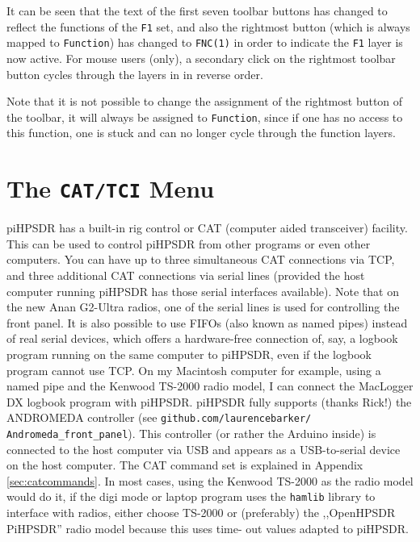 \documentclass[12pt]{book}
\def\bltt#1{\texttt{\color{blue}#1}}
\def\pH{pi\-HPSDR\xspace}
\begin{document}
It can be seen that the text of the first seven toolbar buttons has changed to reflect
the functions of the \texttt{F1} set, and also the rightmost button (which is always mapped
to \bltt{Function}) has changed to \texttt{FNC(1)} in order to indicate the \texttt{F1}
layer is now active. For mouse users (only), a secondary click on the rightmost toolbar
button cycles through the layers in in reverse order.

Note that it is not possible to change the assignment of the  rightmost button of the toolbar,
it will always be assigned to \bltt{Function}, since if one has no access to this
function, one is stuck and can no longer cycle through the function layers.

\section{The \texttt{CAT/TCI} Menu}

\pH has a built-in rig control or CAT (computer aided transceiver) facility. This can be used to control
\pH from other programs or even other computers. You can have up to three simultaneous CAT connections
via TCP, and three additional CAT connections via serial lines (provided the host computer running \pH
has those serial interfaces available). Note that on the new Anan G2-Ultra radios, one of the serial lines
is used for controlling the front panel.
It is also possible to use FIFOs (also known as named pipes) instead of real serial devices, which offers a
hardware-free connection
of, say, a logbook program running on the same computer to \pH, even if the logbook program cannot use
TCP. On my Macintosh computer for example, using a named pipe and the Kenwood TS-2000 radio model,
I can connect the MacLogger DX logbook program with \pH.
\pH fully supports (thanks Rick!) the ANDROMEDA controller (see \texttt{github.com/laurencebarker/
Andromeda\_front\_panel}).
This controller (or rather the Arduino inside) is connected to the host computer via USB and appears as a
USB-to-serial
device on the host computer. The CAT command set is explained in Appendix \ref{sec:catcommands}. In most
cases, using
the Kenwood TS-2000 as the radio model would do it, if the digi mode or laptop program uses the \texttt{hamlib} library  to
interface with
radios, either choose TS-2000 or (preferably) the ,,OpenHPSDR PiHPSDR'' radio model because this uses time-
out values
adapted to \pH.
\end{document}

